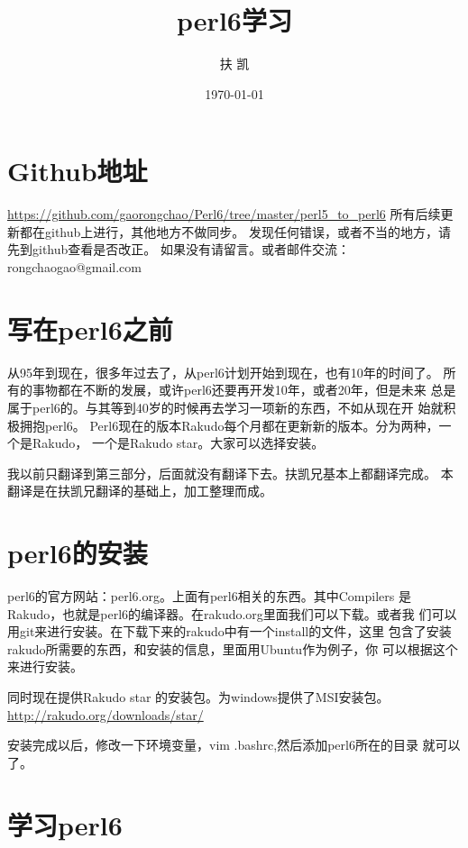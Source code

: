 \documentclass{ctexart}
\title{perl6学习}
\author{扶 凯}
\date{\today}
\begin{document}
\maketitle

\setcounter{tocdepth}{3}
\tableofcontents
\vspace*{1cm}
\section{Github地址}
\label{sec-1}

\href{https://github.com/gaorongchao/Perl6/tree/master/perl5_to_perl6}{https://github.com/gaorongchao/Perl6/tree/master/perl5\_to\_perl6}
所有后续更新都在github上进行，其他地方不做同步。
发现任何错误，或者不当的地方，请先到github查看是否改正。
如果没有请留言。或者邮件交流：rongchaogao@gmail.com
\section{写在perl6之前}
\label{sec-2}

从95年到现在，很多年过去了，从perl6计划开始到现在，也有10年的时间了。
所有的事物都在不断的发展，或许perl6还要再开发10年，或者20年，但是未来
总是属于perl6的。与其等到40岁的时候再去学习一项新的东西，不如从现在开
始就积极拥抱perl6。
Perl6现在的版本Rakudo每个月都在更新新的版本。分为两种，一个是Rakudo，
一个是Rakudo star。大家可以选择安装。

我以前只翻译到第三部分，后面就没有翻译下去。扶凯兄基本上都翻译完成。
本翻译是在扶凯兄翻译的基础上，加工整理而成。
\section{perl6的安装}
\label{sec-3}

perl6的官方网站：perl6.org。上面有perl6相关的东西。其中Compilers
是Rakudo，也就是perl6的编译器。在rakudo.org里面我们可以下载。或者我
们可以用git来进行安装。在下载下来的rakudo中有一个install的文件，这里
包含了安装rakudo所需要的东西，和安装的信息，里面用Ubuntu作为例子，你
可以根据这个来进行安装。

同时现在提供Rakudo star 的安装包。为windows提供了MSI安装包。
\href{http://rakudo.org/downloads/star/}{http://rakudo.org/downloads/star/}

安装完成以后，修改一下环境变量，vim .bashrc,然后添加perl6所在的目录
就可以了。
\section{学习perl6}
\label{sec-4}
\end{document}
